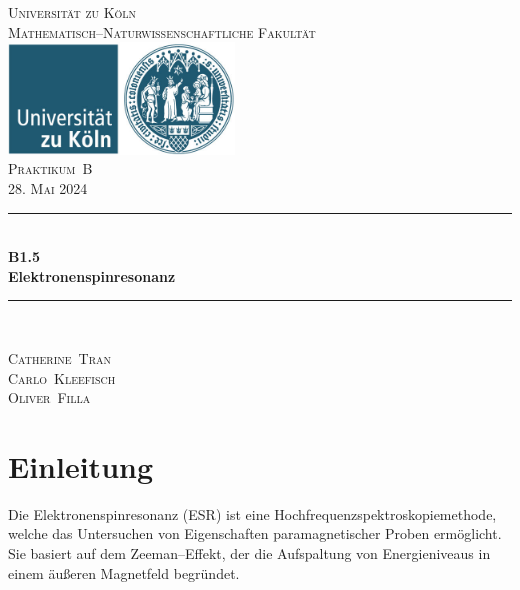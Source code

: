\documentclass[12pt,a4paper]{scrartcl}
\numberwithin{equation}{section} %
\newcommand{\HRule}{\rule{\linewidth}{0.7mm}}
\begin{document}
\begin{titlepage}
	\pagestyle{empty}

	\begin{center}

	\textsc{\LARGE Universität zu Köln }\\ [0.4cm]
	\textsc{Mathematisch--Naturwissenschaftliche Fakultät} \\[1.5cm]

	\includegraphics[width=0.45\textwidth]{../media/uni.jpg} \\[1.5cm]  %

	\textsc{\Large Praktikum~B}\\[2mm]
	\textsc{28. Mai 2024}\\[10mm]
	\HRule \\[0.4cm]

		{	\Huge \bfseries B1.5}\\[0.4cm]
			{	\huge \bfseries Elektronenspinresonanz}\\[0.3cm]
	
	\HRule \\[3cm]

 	\begin{center}
		\textsc{\Large Catherine~Tran } \\[3pt]
		\textsc{\Large Carlo~Kleefisch } \\[3pt]
		\textsc{\Large Oliver~Filla } \\[3pt]
	\end{center}
	\end{center}
\end{titlepage}

\newpage
\tableofcontents
\newpage

\clearpage
\hypertarget{einleitung}{%
\section{Einleitung}\label{einleitung}}

Die Elektronenspinresonanz (ESR) ist eine Hochfrequenzspektroskopiemethode, welche das Untersuchen von Eigenschaften paramagnetischer Proben ermöglicht. Sie basiert auf dem Zeeman--Effekt, der die Aufspaltung von Energieniveaus in einem äußeren Magnetfeld begründet.
\end{document}
